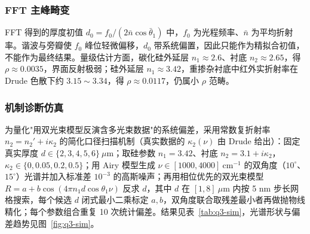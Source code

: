 \documentclass[withoutpreface,bwprint]{cumcmthesis}
\begin{document}
\subsubsection{FFT 主峰畸变}

FFT 得到的厚度初值 $d_0 = f_0/(2\bar n\cos\bar\theta_1)$ 中，$f_0$ 为光程频率、$\bar n$ 为平均折射率。谐波与旁瓣使 $f_0$ 峰位轻微偏移，$d_0$ 带系统偏置，因此只能作为精拟合初值，不能作为最终结果。量级估计方面，碳化硅外延层 $n_1\approx2.6$、衬底 $n_2\approx2.65$，得 $\rho\approx0.0035$，界面反射极弱；硅外延层 $n_1\approx3.42$，重掺杂衬底中红外实折射率在 Drude 色散下约 $3.15\sim3.34$，得 $\rho\approx0.0117$，仍属小 $\rho$ 范畴。

\subsubsection{机制诊断仿真}

为量化"用双光束模型反演含多光束数据"的系统偏差，采用常数复折射率 $n_2=n_2'+i\kappa_2$ 的简化口径扫描机制（真实数据的 $\kappa_2(\nu)$ 由 Drude 给出）：固定真实厚度 $d\in\{2,3,4,5,6\}\ \mu$m；取硅参数 $n_1=3.42$、衬底 $n_2=3.1+i\kappa_2$，$\kappa_2\in\{0,0.05,0.2,0.5\}$；用 Airy 模型生成 $\nu\in[1000,4000]\ \mathrm{cm^{-1}}$ 的双角度（$10^{\circ}$、$15^{\circ}$）光谱并加入标准差 $10^{-3}$ 的高斯噪声；再用相位优先的双光束模型 $R=a+b\cos(4\pi n_1 d\cos\theta_1\nu)$ 反求 $d$，其中 $d$ 在 $[1,8]\ \mu$m 内按 5 nm 步长网格搜索，每个候选 $d$ 闭式最小二乘标定 $a,b$，双角度联合取残差最小者再做抛物线精化；每个参数组合重复 10 次统计偏差。结果见表~\ref{tab:q3-sim}，光谱形状与偏差趋势见图~\ref{fig:q3-sim}。
\end{document}
